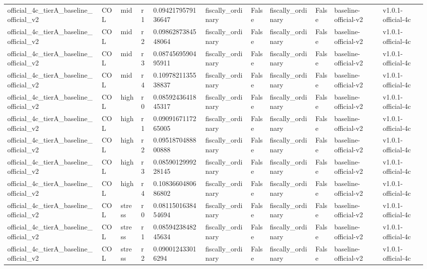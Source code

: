 \begin{table}[!htbp]
\begin{tabular}{lllllllllll}
official\_4c\_tierA\_baseline\_official\_v2 & COL & mid & r1 & 0.0942179579136647 & fiscally\_ordinary & False & fiscally\_ordinary & False & baseline-official-v2 & v1.0.1-official-4c \\
official\_4c\_tierA\_baseline\_official\_v2 & COL & mid & r2 & 0.0986287384548064 & fiscally\_ordinary & False & fiscally\_ordinary & False & baseline-official-v2 & v1.0.1-official-4c \\
official\_4c\_tierA\_baseline\_official\_v2 & COL & mid & r3 & 0.0874569590495911 & fiscally\_ordinary & False & fiscally\_ordinary & False & baseline-official-v2 & v1.0.1-official-4c \\
official\_4c\_tierA\_baseline\_official\_v2 & COL & mid & r4 & 0.1097821135538837 & fiscally\_ordinary & False & fiscally\_ordinary & False & baseline-official-v2 & v1.0.1-official-4c \\
official\_4c\_tierA\_baseline\_official\_v2 & COL & high & r0 & 0.0859243641845317 & fiscally\_ordinary & False & fiscally\_ordinary & False & baseline-official-v2 & v1.0.1-official-4c \\
official\_4c\_tierA\_baseline\_official\_v2 & COL & high & r1 & 0.0909167117265005 & fiscally\_ordinary & False & fiscally\_ordinary & False & baseline-official-v2 & v1.0.1-official-4c \\
official\_4c\_tierA\_baseline\_official\_v2 & COL & high & r2 & 0.0951870488800888 & fiscally\_ordinary & False & fiscally\_ordinary & False & baseline-official-v2 & v1.0.1-official-4c \\
official\_4c\_tierA\_baseline\_official\_v2 & COL & high & r3 & 0.0859012999228145 & fiscally\_ordinary & False & fiscally\_ordinary & False & baseline-official-v2 & v1.0.1-official-4c \\
official\_4c\_tierA\_baseline\_official\_v2 & COL & high & r4 & 0.1083660480686802 & fiscally\_ordinary & False & fiscally\_ordinary & False & baseline-official-v2 & v1.0.1-official-4c \\
official\_4c\_tierA\_baseline\_official\_v2 & COL & stress & r0 & 0.0811501638454694 & fiscally\_ordinary & False & fiscally\_ordinary & False & baseline-official-v2 & v1.0.1-official-4c \\
official\_4c\_tierA\_baseline\_official\_v2 & COL & stress & r1 & 0.0859423848245634 & fiscally\_ordinary & False & fiscally\_ordinary & False & baseline-official-v2 & v1.0.1-official-4c \\
official\_4c\_tierA\_baseline\_official\_v2 & COL & stress & r2 & 0.090012433016294 & fiscally\_ordinary & False & fiscally\_ordinary & False & baseline-official-v2 & v1.0.1-official-4c \\

\end{tabular}
\end{table}
